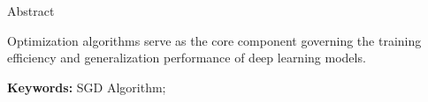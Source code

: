 \pagestyle{plain}
\begin{center}
    Abstract
\end{center}

Optimization algorithms serve as the core component governing the training efficiency and generalization performance of deep learning models. 

\textbf{Keywords: }SGD Algorithm; \quad
\newpage